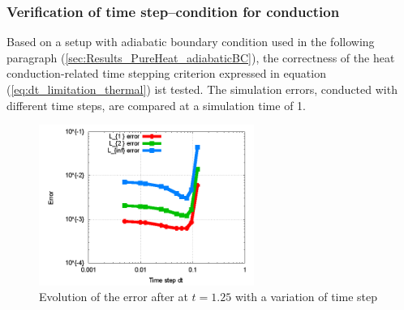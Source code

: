 \documentclass[11pt,a4paper,twoside]{report}
\begin{document}
\subsubsection{Verification of time step--condition for conduction}

Based on a setup with adiabatic boundary condition used in the following paragraph (\ref{sec:Results_PureHeat_adiabaticBC}), the correctness of the
heat conduction-related time stepping criterion expressed in equation (\ref{eq:dt_limitation_thermal}) ist tested. The simulation errors, conducted with different time steps, are compared at a simulation time of 1. 


\begin{figure}[h]  
  \label{fig:PureHeat_dtVerification}
  \centering
  \includegraphics[width=7cm]{Graphics/results/PureHeatConduction/ErrorTimestep}
  \caption{Evolution of the error after at $t=1.25$ with a variation of time step}
\end{figure}
\end{document}

